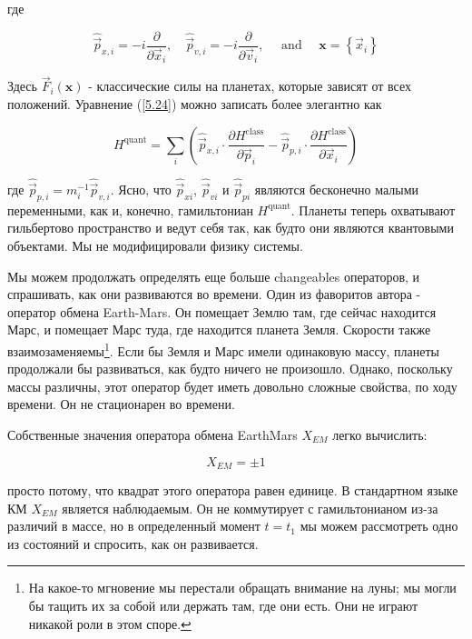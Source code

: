 \documentclass[main.tex]{subfiles}
\begin{document}
где

\begin{equation}\label{5.25}
	\hat{\vec{p}}_{x, i}=-i \frac{\partial}{\partial \vec{x}_{i}}, \quad \hat{\vec{p}}_{v, i}=-i \frac{\partial}{\partial \vec{v}_{i}}, \quad \text { and } \quad \mathbf{x}=\left\{\vec{x}_{i}\right\}
\end{equation}

Здесь $\vec F_i(\mathbf{x})$ - классические силы на планетах, которые зависят от всех положений. Уравнение (\ref{5.24}) можно записать более элегантно как


\begin{equation}\label{5.26}
	H^{\mathrm{quant}}=\sum_{i}\left(\hat{\vec{p}}_{x, i} \cdot \frac{\partial H^{\mathrm{class}}}{\partial \vec{p}_{i}}-\hat{\vec{p}}_{p, i} \cdot \frac{\partial H^{\mathrm{class}}}{\partial \vec{x}_{i}}\right)
\end{equation}

где $\hat{\vec{p}}_{p,i} = m_i^{-1} \hat{\vec{p}}_{v,i}$. Ясно, что $\hat{\vec{p}}_{xi}$, $\hat{\vec{p}}_{vi}$ и $\hat{\vec{p}}_{pi}$ являются бесконечно малыми переменными, как и, конечно, гамильтониан $H^{\mathrm{quant}}$. Планеты теперь охватывают гильбертово пространство и ведут себя так, как будто они являются квантовыми объектами. Мы не модифицировали физику системы.

Мы можем продолжать определять еще больше changeables операторов, и спрашивать, как они развиваются во времени. Один из фаворитов автора - оператор обмена Earth-Mars. Он помещает Землю там, где сейчас находится Марс, и помещает Марс туда, где находится планета Земля. Скорости также взаимозаменяемы\footnote{ На какое-то мгновение мы перестали обращать внимание на луны; мы могли бы тащить их за собой или держать там, где они есть. Они не играют никакой роли в этом споре.}. Если бы Земля и Марс имели одинаковую массу, планеты продолжали бы развиваться, как будто ничего не произошло. Однако, поскольку массы различны, этот оператор будет иметь довольно сложные свойства, по ходу времени. Он не стационарен во времени.

Собственные значения оператора обмена EarthMars $X_{EM}$ легко вычислить:

\begin{equation}\label{5.27}
	X_{EM} = \pm1
\end{equation}

просто потому, что квадрат этого оператора равен единице. В стандартном языке КМ $X_{EM}$ является наблюдаемым. Он не коммутирует с гамильтонианом из-за различий в массе, но в определенный момент $t = t_1$ мы можем рассмотреть одно из состояний и спросить, как он развивается.
\end{document}
